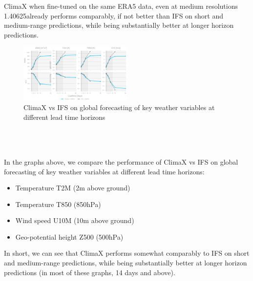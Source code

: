 \documentclass[../paper.tex]{subfiles}
\begin{document}
            ClimaX when fine-tuned on the same ERA5 data,
            even at medium resolutions 1.40625\textdegree already performs comparably,
            if not better than IFS on short and medium-range predictions,
            while being substantially better at longer horizon predictions\cite{d1}.
            \begin{figure}[h]
            \centering
            \includegraphics[width=0.5\textwidth]{../photos/climax_ifs}
            \caption{ClimaX vs IFS on global forecasting of key weather variables at different lead time horizons}
            \label{fig:climax-vs-ifs}
            \end{figure}\\\\\\
            In the graphs above,
            we compare the performance of ClimaX vs IFS on global forecasting of key weather variables at different lead time horizons:
            \begin{itemize}
                \item Temperature T2M (2m above ground)
                \item Temperature T850 (850hPa)
                \item Wind speed U10M (10m above ground)
                \item Geo-potential height Z500 (500hPa)
            \end{itemize}
            In short, we can see that ClimaX performs somewhat comparably to IFS on short and medium-range predictions,
            while being substantially better at longer horizon predictions (in most of these graphs, 14 days and above).\\
\end{document}
